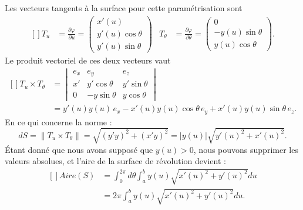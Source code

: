 Les vecteurs tangents à la surface pour cette paramétrisation sont
\begin{equation}
    \begin{aligned}[]
        T_u&=\frac{ \partial \varphi }{ \partial u }=\begin{pmatrix}
            x'(u)    \\
            y'(u)\cos\theta    \\
            y'(u)\sin\theta
        \end{pmatrix}&
        T_{\theta}&=\frac{ \partial \varphi }{ \partial \theta }=\begin{pmatrix}
            0    \\
            -y(u)\sin\theta    \\
            y(u)\cos\theta
        \end{pmatrix}.
    \end{aligned}
\end{equation}
Le produit vectoriel de ces deux vecteurs vaut
\begin{equation}
    \begin{aligned}[]
        T_u\times T_{\theta}&=\begin{vmatrix}
            e_x    &   e_y    &   e_z    \\
            x'    &   y'\cos\theta    &   y'\sin\theta    \\
            0    &   -y\sin\theta    &   y\cos\theta
        \end{vmatrix}\\
        &=y'(u)y(u)\,e_x-x'(u)y(u)\cos\theta\, e_y+x'(u)y(u)\sin\theta\, e_z.
    \end{aligned}
\end{equation}
En ce qui concerne la norme :
\begin{equation}
    dS=\| T_u\times T_{\theta} \|=\sqrt{(y'y)^2+(x'y)^2}=| y(u) |\sqrt{y'(u)^2+x'(u)^2}.
\end{equation}
Étant donné que nous avons supposé que $y(u)>0$, nous pouvons supprimer les valeurs absolues, et l'aire de la surface de révolution devient :
\begin{equation}
    \begin{aligned}[]
        Aire(S)&=\int_0^{2\pi}d\theta\int_a^b y(u)\sqrt{x'(u)^2+y'(u)^2}du\\
        &=2\pi\int_a^b y(u)\sqrt{x'(u)^2+y'(u)^2}du.
    \end{aligned}
\end{equation}

